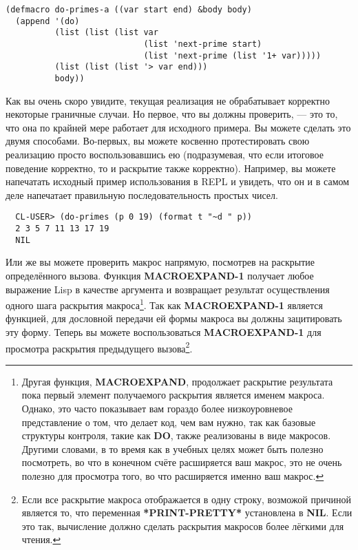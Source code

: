 \begin{lstlisting}
(defmacro do-primes-a ((var start end) &body body)
  (append '(do)
          (list (list (list var
                            (list 'next-prime start)
                            (list 'next-prime (list '1+ var)))))
          (list (list (list '> var end)))
          body))
\end{lstlisting}

Как вы очень скоро увидите, текущая реализация  не обрабатывает корректно
некоторые граничные случаи. Но первое, что вы должны проверить, --- это то, что она по
крайней мере работает для исходного примера. Вы можете сделать это двумя
способами. Во-первых, вы можете косвенно протестировать свою реализацию просто
воспользовавшись ею (подразумевая, что если итоговое поведение корректно, то и раскрытие
также корректно). Например, вы можете напечатать исходный пример использования
 в REPL и увидеть, что он и в самом деле напечатает правильную
последовательность простых чисел.

\begin{verbatim}
  CL-USER> (do-primes (p 0 19) (format t "~d " p))
  2 3 5 7 11 13 17 19
  NIL
\end{verbatim}

Или же вы можете проверить макрос напрямую, посмотрев на раскрытие определённого
вызова. Функция \textbf{MACROEXPAND-1} получает любое выражение Lisp в качестве аргумента
и возвращает результат осуществления одного шага раскрытия макроса\footnote{Другая
  функция, \textbf{MACROEXPAND}, продолжает раскрытие результата пока первый элемент
  получаемого раскрытия является именем макроса. Однако, это часто показывает вам гораздо
  более низкоуровневое представление о том, что делает код, чем вам нужно, так как базовые
  структуры контроля, такие как \textbf{DO}, также реализованы в виде макросов. Другими
  словами, в то время как в учебных целях может быть полезно посмотреть, во что в конечном
  счёте расширяется ваш макрос, это не очень полезно для просмотра того, во что
  расширяется именно ваш макрос.}. Так как \textbf{MACROEXPAND-1} является функцией, для
дословной передачи ей формы макроса вы должны зацитировать эту форму. Теперь вы можете
воспользоваться \textbf{MACROEXPAND-1} для просмотра раскрытия предыдущего
вызова\footnote{Если все раскрытие макроса отображается в одну строку, возможой причиной
  является то, что переменная \textbf{ *PRINT-PRETTY* } установлена в \textbf{NIL}. Если
  это так, вычисление  должно сделать раскрытия макросов
  более лёгкими для чтения.}.

